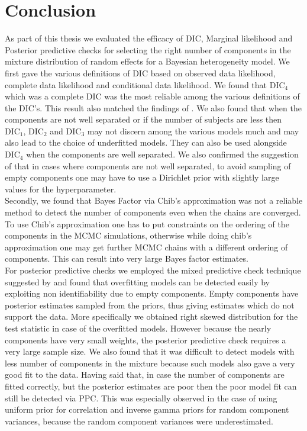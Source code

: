 
\chapter{Conclusion}
\label{ch : conclusion}

As part of this thesis we evaluated the efficacy of DIC, Marginal likelihood and Posterior predictive checks for selecting the right number of components in the mixture distribution of random effects for a Bayesian heterogeneity model. We first gave the various definitions of DIC based on observed data likelihood, complete data likelihood and conditional data likelihood. We found that $\text{DIC}_4$ which was a complete DIC was the most reliable among the various definitions of the DIC's. This result also matched the findings of \citet{celeux_deviance_2006}. We also found that when the components are not well separated or if the number of subjects are less then $\text{DIC}_1$, $\text{DIC}_2$ and $\text{DIC}_3$ may not discern among the various models much and may also lead to the choice of underfitted models. They can also be used alongside $\text{DIC}_4$ when the components are well separated. We also confirmed the suggestion of \citet{fruhwirth-schnatter_finite_2013} that in cases where components are not well separated, to avoid sampling of empty components one may have to use a Dirichlet prior with slightly large values for the hyperparameter.\\

Secondly, we found that Bayes Factor via Chib's approximation was not a reliable method to detect the number of components even when the chains are converged. To use Chib's approximation one has to put constraints on the ordering of the components in the MCMC simulations, otherwise while doing chib's approximation one may get further MCMC chains with a different ordering of components. This can result into very large Bayes factor estimates.\\

For posterior predictive checks we employed the mixed predictive check technique suggested by \citet{marshall_approximate_2003} and found that overfitting models can be detected easily by exploiting non identifiability due to empty components. Empty components have posterior estimates sampled from the priors, thus giving estimates which do not support the data. More specifically we obtained right skewed distribution for the test statistic in case of the overfitted models. However because the nearly components have very small weights, the posterior predictive check requires a very large sample size. We also found that it was difficult to detect models with less number of components in the mixture because such models also gave a very good fit to the data. Having said that, in case the number of components are fitted correctly, but the posterior estimates are poor then the poor model fit can still be detected via PPC. This was especially observed in the case of using uniform prior for correlation and inverse gamma priors for random component variances, because the random component variances were underestimated.\\

